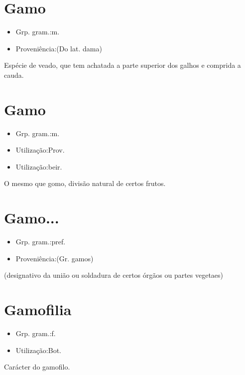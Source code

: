 \section{Gamo}
\begin{itemize}
\item {Grp. gram.:m.}
\end{itemize}
\begin{itemize}
\item {Proveniência:(Do lat. \textunderscore dama\textunderscore )}
\end{itemize}
Espécie de veado, que tem achatada a parte superior dos galhos e comprida a cauda.
\section{Gamo}
\begin{itemize}
\item {Grp. gram.:m.}
\end{itemize}
\begin{itemize}
\item {Utilização:Prov.}
\end{itemize}
\begin{itemize}
\item {Utilização:beir.}
\end{itemize}
O mesmo que \textunderscore gomo\textunderscore , divisão natural de certos frutos.
\section{Gamo...}
\begin{itemize}
\item {Grp. gram.:pref.}
\end{itemize}
\begin{itemize}
\item {Proveniência:(Gr. \textunderscore gamos\textunderscore )}
\end{itemize}
(designativo da união ou soldadura de certos órgãos ou partes vegetaes)
\section{Gamofilia}
\begin{itemize}
\item {Grp. gram.:f.}
\end{itemize}
\begin{itemize}
\item {Utilização:Bot.}
\end{itemize}
Carácter do gamofilo.
